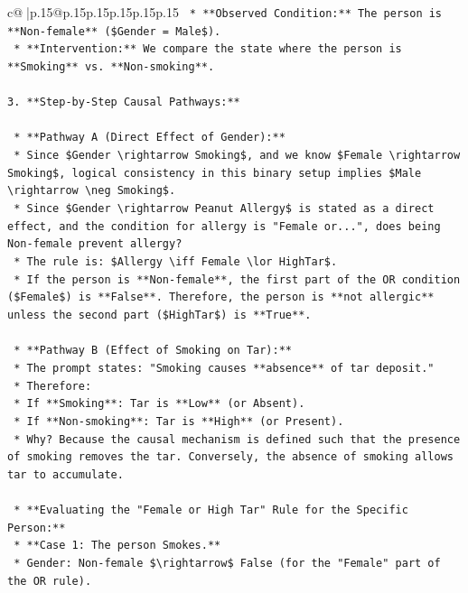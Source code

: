 \documentclass{article}
\begin{document}
{\begin{supertabular}{c@{$\;$}|p{.15\linewidth}@{}p{.15\linewidth}p{.15\linewidth}p{.15\linewidth}p{.15\linewidth}p{.15\linewidth}}
{{{\texttt{    *   **Observed Condition:** The person is **Non{-}female** (\$Gender = Male\$).} \\
\texttt{    *   **Intervention:** We compare the state where the person is **Smoking** vs. **Non{-}smoking**.} \\
\\ 
\texttt{3.  **Step{-}by{-}Step Causal Pathways:**} \\
\\ 
\texttt{    *   **Pathway A (Direct Effect of Gender):**} \\
\texttt{        *   Since \$Gender \textbackslash{}rightarrow Smoking\$, and we know \$Female \textbackslash{}rightarrow Smoking\$, logical consistency in this binary setup implies \$Male \textbackslash{}rightarrow \textbackslash{}neg Smoking\$.} \\
\texttt{        *   Since \$Gender \textbackslash{}rightarrow Peanut Allergy\$ is stated as a direct effect, and the condition for allergy is "Female or...", does being Non{-}female prevent allergy?} \\
\texttt{        *   The rule is: \$Allergy \textbackslash{}iff Female \textbackslash{}lor HighTar\$.} \\
\texttt{        *   If the person is **Non{-}female**, the first part of the OR condition (\$Female\$) is **False**. Therefore, the person is **not allergic** unless the second part (\$HighTar\$) is **True**.} \\
\\ 
\texttt{    *   **Pathway B (Effect of Smoking on Tar):**} \\
\texttt{        *   The prompt states: "Smoking causes **absence** of tar deposit."} \\
\texttt{        *   Therefore:} \\
\texttt{            *   If **Smoking**: Tar is **Low** (or Absent).} \\
\texttt{            *   If **Non{-}smoking**: Tar is **High** (or Present).} \\
\texttt{        *   Why? Because the causal mechanism is defined such that the presence of smoking removes the tar. Conversely, the absence of smoking allows tar to accumulate.} \\
\\ 
\texttt{    *   **Evaluating the "Female or High Tar" Rule for the Specific Person:**} \\
\texttt{        *   **Case 1: The person Smokes.**} \\
\texttt{            *   Gender: Non{-}female \$\textbackslash{}rightarrow\$ False (for the "Female" part of the OR rule).} \\
}}}
\end{supertabular}}
\end{document}
